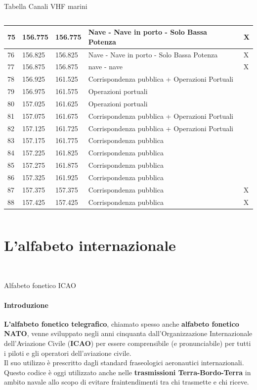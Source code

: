 \documentclass[aspectratio=169]{beamer}
\begin{document}
\begin{frame}{Tabella Canali VHF marini}
\begin{columns}
{\begin{tabular}{|l|l|l|l|l|}
		75 & 156.775 & 156.775 & Nave - Nave in porto - Solo Bassa Potenza & X \\ \hline
		76 & 156.825 & 156.825 & Nave - Nave in porto - Solo Bassa Potenza & X \\ \hline
		77 & 156.875 & 156.875 & nave - nave & X \\ \hline
		78 & 156.925 & 161.525 & Corrispondenza pubblica + Operazioni Portuali &\\ \hline
		79 & 156.975 & 161.575 & Operazioni portuali &\\ \hline
		80 & 157.025 & 161.625 & Operazioni portuali &\\ \hline
		81 & 157.075 & 161.675 & Corrispondenza pubblica + Operazioni Portuali &\\ \hline
		82 & 157.125 & 161.725 & Corrispondenza pubblica + Operazioni Portuali &\\ \hline
		83 & 157.175 & 161.775 & Corrispondenza pubblica &\\ \hline
		84 & 157.225 & 161.825 & Corrispondenza pubblica &\\ \hline
		85 & 157.275 & 161.875 & Corrispondenza pubblica &\\ \hline
		86 & 157.325 & 161.925 & Corrispondenza pubblica &\\ \hline
		87 & 157.375 & 157.375 & Corrispondenza pubblica & X \\ \hline
		88 & 157.425 & 157.425 & Corrispondenza pubblica & X \\ \hline
	\end{tabular}}
	\end{columns}
\end{frame}

\section{L'alfabeto internazionale}
\begin{frame}
	\\
\end{frame}

\begin{frame}{Alfabeto fonetico ICAO}
	\framesubtitle{Introduzione}
	\textbf{L'alfabeto fonetico telegrafico}, chiamato spesso anche \textbf{alfabeto fonetico NATO}, venne sviluppato negli anni cinquanta dall'Organizzazione Internazionale dell'Aviazione Civile (\textbf{ICAO}) per essere comprensibile (e pronunciabile) per tutti i piloti e gli operatori dell'aviazione civile.\\
	Il suo utilizzo è prescritto dagli standard fraseologici aeronautici internazionali.\\
	Questo codice è oggi utilizzato anche nelle \textbf{trasmissioni Terra-Bordo-Terra} in ambito navale allo scopo di evitare fraintendimenti tra chi trasmette e chi riceve.\\
\end{frame}
\end{document}
